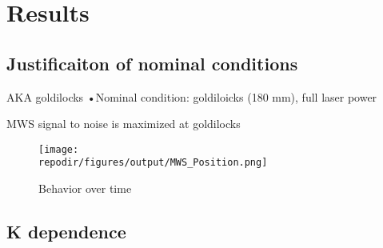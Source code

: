 

\section{Results}

\subsection{Justificaiton of nominal conditions}

AKA goldilocks
•Nominal condition: goldiloicks (180 mm), full laser power

MWS signal to noise is maximized at goldilocks


\begin{figure}[h]
    \texttt{[image: \\repodir/figures/output/MWS\_Position.png]} 
    \caption{Behavior over time}
    \label{fig:efficiency}
\end{figure}

\subsection{K dependence}